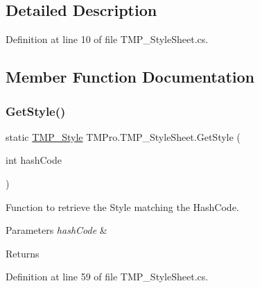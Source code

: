 \subsection{Detailed Description}


Definition at line 10 of file T\+M\+P\+\_\+\+Style\+Sheet.\+cs.



\subsection{Member Function Documentation}
\mbox{\label{class_t_m_pro_1_1_t_m_p___style_sheet_a238d4f39d98e02352e4a9633ba08d126}} 
\subsubsection{\texorpdfstring{GetStyle()}{GetStyle()}}
{\footnotesize\ttfamily static \mbox{\hyperlink{class_t_m_pro_1_1_t_m_p___style}{T\+M\+P\+\_\+\+Style}} T\+M\+Pro.\+T\+M\+P\+\_\+\+Style\+Sheet.\+Get\+Style (\begin{DoxyParamCaption}\item[{int}]{hash\+Code }\end{DoxyParamCaption})\hspace{0.3cm}{\ttfamily [static]}}



Function to retrieve the Style matching the Hash\+Code. 


\begin{DoxyParams}{Parameters}
{\em hash\+Code} & \\
\hline
\end{DoxyParams}
\begin{DoxyReturn}{Returns}

\end{DoxyReturn}


Definition at line 59 of file T\+M\+P\+\_\+\+Style\+Sheet.\+cs.

\mbox{\label{class_t_m_pro_1_1_t_m_p___style_sheet_a653c12d4d1759a054f7f37a2d0b33924}} 
